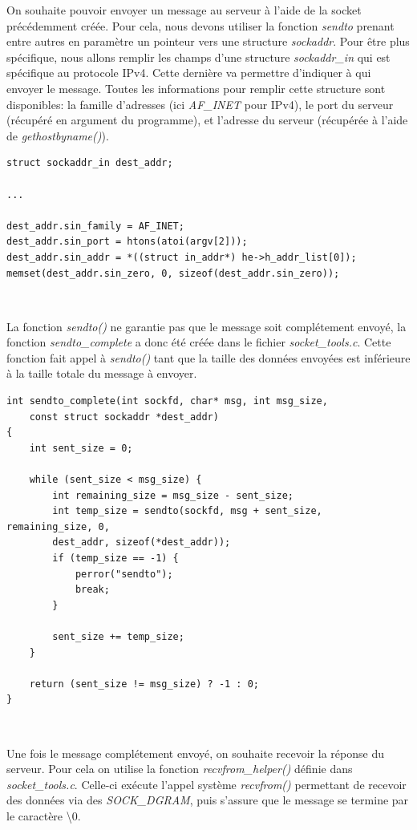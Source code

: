 On souhaite pouvoir envoyer un message au serveur à l'aide de la socket précédemment créée. Pour cela, nous devons utiliser la fonction \emph{sendto} prenant entre autres en paramètre un pointeur vers une structure \emph{sockaddr}. Pour être plus spécifique, nous allons remplir les champs d'une structure \emph{sockaddr\_in} qui est spécifique au protocole IPv4. Cette dernière va permettre d'indiquer à qui envoyer le message. Toutes les informations pour remplir cette structure sont disponibles: la famille d'adresses (ici \emph{AF\_INET} pour IPv4), le port du serveur (récupéré en argument du programme), et l'adresse du serveur (récupérée à l'aide de \emph{gethostbyname()}).

\begin{lstlisting}
struct sockaddr_in dest_addr;

...

dest_addr.sin_family = AF_INET;
dest_addr.sin_port = htons(atoi(argv[2]));
dest_addr.sin_addr = *((struct in_addr*) he->h_addr_list[0]);
memset(dest_addr.sin_zero, 0, sizeof(dest_addr.sin_zero));
\end{lstlisting}
\

La fonction \emph{sendto()} ne garantie pas que le message soit complétement envoyé, la fonction \emph{sendto\_complete} a donc été créée dans le fichier \emph{socket\_tools.c}. Cette fonction fait appel à \emph{sendto()} tant que la taille des données envoyées est inférieure à la taille totale du message à envoyer.

\begin{lstlisting}
int sendto_complete(int sockfd, char* msg, int msg_size,
    const struct sockaddr *dest_addr)
{
    int sent_size = 0;

    while (sent_size < msg_size) {
        int remaining_size = msg_size - sent_size;
        int temp_size = sendto(sockfd, msg + sent_size, remaining_size, 0,
        dest_addr, sizeof(*dest_addr));
        if (temp_size == -1) {
            perror("sendto");
            break;
        }

        sent_size += temp_size;
    }

    return (sent_size != msg_size) ? -1 : 0;
}
\end{lstlisting}
\

Une fois le message complétement envoyé, on souhaite recevoir la réponse du serveur. Pour cela on utilise la fonction \emph{recvfrom\_helper()} définie dans \emph{socket\_tools.c}. Celle-ci exécute l'appel système \emph{recvfrom()} permettant de recevoir des données via des \emph{SOCK\_DGRAM}, puis s'assure que le message se termine par le caractère \textbackslash 0.

